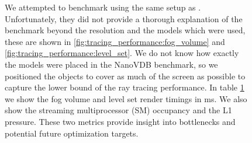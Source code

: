 \begin{figure}[H]
{\begin{tabularx}{\textwidth}{|c|X|X|X|X|X|X|}
            \hline
        \end{tabularx}
        \label{tab:tracing_performance:numbers}
    }
    \caption{We attempted to benchmark using the same setup as \cite{NanoVDBBenchmark}. Unfortunately, they did not provide a thorough explanation of the benchmark beyond the resolution and the models which were used, these are shown in \ref{fig:tracing_performance:fog_volume} and \ref{fig:tracing_performance:level_set}. We do not know how exactly the models were placed in the NanoVDB benchmark, so we positioned the objects to cover as much of the screen as possible to capture the lower bound of the ray tracing performance. In table \ref{tab:tracing_performance:numbers} we show the fog volume and level set render timings in ms. We also show the streaming multiprocessor (SM) occupancy and the L1 pressure. These two metrics provide insight into bottlenecks and potential future optimization targets.}
\end{figure}